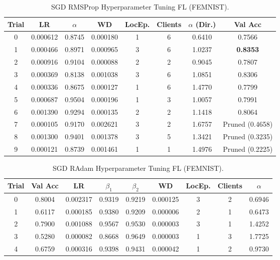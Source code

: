 \documentclass[10pt,twocolumn,letterpaper]{article}
\begin{document}
    \begin{table}[h!]
    \centering
    \caption{SGD RMSProp Hyperparameter Tuning FL (FEMNIST).}
    \label{tab:rmsprop_tuning}
    \begin{tabular}{|c|c|c|c|c|c|c|c|}
    \hline
    \textbf{Trial} & \textbf{LR} & $\alpha$ & \textbf{WD} & \textbf{LocEp.} & \textbf{Clients} & $\alpha$ (Dir.) & \textbf{Val Acc} \\
    \hline
    0 & 0.000612 & 0.8745 & 0.000180 & 1 & 6 & 0.6410 & 0.7566 \\
    \hline
    1 & 0.000466 & 0.8971 & 0.000965 & 3 & 6 & 1.0237 & \textbf{0.8353} \\
    \hline
    2 & 0.000916 & 0.9104 & 0.000088 & 2 & 2 & 0.9045 & 0.7807 \\
    \hline
    3 & 0.000369 & 0.8138 & 0.001038 & 3 & 6 & 1.0851 & 0.8306 \\
    \hline
    4 & 0.000336 & 0.8675 & 0.000127 & 1 & 6 & 1.4770 & 0.7799 \\
    \hline
    5 & 0.000687 & 0.9504 & 0.000196 & 1 & 3 & 1.0057 & 0.7991 \\
    \hline
    6 & 0.001390 & 0.9294 & 0.000135 & 2 & 2 & 1.1418 & 0.8064 \\
    \hline
    7 & 0.000105 & 0.9170 & 0.002621 & 3 & 2 & 1.6757 & Pruned (0.4658) \\
    \hline
    8 & 0.001300 & 0.9401 & 0.001378 & 3 & 5 & 1.3421 & Pruned (0.3235) \\
    \hline
    9 & 0.000121 & 0.8739 & 0.001461 & 1 & 1 & 1.4976 & Pruned (0.2225) \\
    \hline
    \end{tabular}
    \end{table}

    \begin{table}[h]
        \centering
        \caption{SGD RAdam Hyperparameter Tuning FL (FEMNIST).}
        \label{tab:radam_fl_tuning}
        \begin{tabular}{|c|c|c|c|c|c|c|c|c|}
            \hline
            \textbf{Trial} & \textbf{Val Acc} & \textbf{LR} & $\beta_1$ & $\beta_2$ & \textbf{WD} & \textbf{LocEp.} & \textbf{Clients} & $\alpha$ \\
            \hline
            0 & 0.8004 & 0.002317 & 0.9319 & 0.9219 & 0.000125 & 3 & 2 & 0.6946 \\
            \hline
            1 & 0.6117 & 0.000185 & 0.9380 & 0.9209 & 0.000006 & 2 & 1 & 0.6473 \\
            \hline
            2 & 0.7900 & 0.001088 & 0.9567 & 0.9530 & 0.000003 & 3 & 1 & 1.4252 \\
            \hline
            3 & 0.5280 & 0.000082 & 0.8668 & 0.9649 & 0.000003 & 1 & 3 & 1.7725 \\
            \hline
            4 & 0.6759 & 0.000316 & 0.9398 & 0.9431 & 0.000042 & 1 & 2 & 0.9730 \\
            \hline
        \end{tabular}
    \end{table}
\end{document}
